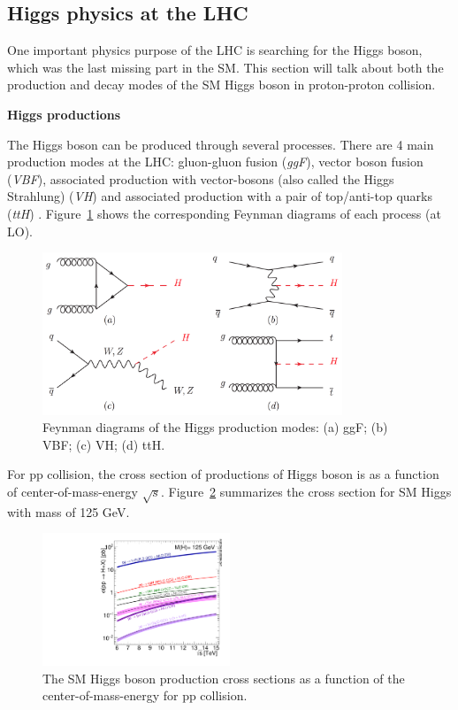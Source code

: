 \subsection{Higgs physics at the LHC}
\label{higgs}

One important physics purpose of the LHC is searching for the Higgs boson, which was the last missing part in the SM.
This section will talk about both the production and decay modes of the SM Higgs boson in proton-proton collision.

\textbf{Higgs productions}

The Higgs boson can be produced through several processes.
There are 4 main production modes at the LHC: gluon-gluon fusion (\textit{ggF}), vector boson fusion (\textit{VBF}),
associated production with vector-bosons (also called the Higgs Strahlung) (\textit{VH}) 
and associated production with a pair of top/anti-top quarks (\textit{ttH}) \cite{Grojean:2243593}.
Figure~\ref{fig:higgs_productions_fd} shows the corresponding Feynman diagrams of each process (at LO).
\begin{figure}[!htb]
  \centering
  \includegraphics[width=0.8\textwidth]{figures/Theory/Figures_FeynmanHprod.png}
  \caption{Feynman diagrams of the Higgs production modes:
	   (a) ggF; (b) VBF; (c) VH; (d) ttH.}
  \label{fig:higgs_productions_fd}
\end{figure}
For pp collision, the cross section of productions of Higgs boson is as a function of center-of-mass-energy $\sqrt{s}$. 
Figure~\ref{fig:higgs_productions_xs} summarizes the cross section for SM Higgs with mass of 125 GeV.\\
\begin{figure}[!htb]
  \centering
  \includegraphics[width=0.5\textwidth]{figures/Theory/Plot_Escan_H125_new_sqrt.pdf}
  \caption{The SM Higgs boson production cross sections as a function of the center-of-mass-energy for pp collision.}
  \label{fig:higgs_productions_xs}
\end{figure}
